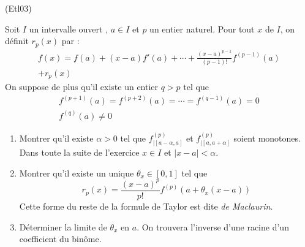 \begin{tiny}(Etl03)\end{tiny}
Soit $I$ un intervalle ouvert , $a\in I$ et $p$ un entier naturel. Pour tout $x$ de $I$, on définit $r_p(x)$ par :
\begin{multline*}
 f(x) = f(a)+(x-a)f'(a)+\cdots+\frac{(x-a)^{p-1}}{(p-1)!}f^{(p-1)}(a)\\+r_p(x)
\end{multline*}
On suppose de plus qu'il existe un entier $q>p$ tel que
\begin{multline*}
 f^{(p+1)}(a)=f^{(p+2)}(a)=\cdots=f^{(q-1)}(a)=0 \\ f^{(q)}(a)\neq 0
\end{multline*}
\begin{enumerate}
 \item Montrer qu'il existe $\alpha >0$ tel que $f^{(p)}_{|[a-\alpha, a]}$ et $f^{(p)}_{|[a, a +\alpha]}$ soient monotones. Dans toute la suite de l'exercice $x\in I$ et $|x-a|<\alpha$.
\item Montrer qu'il existe un unique $\theta_x\in[0,1]$ tel que
\begin{displaymath}
 r_p(x) = \frac{(x-a)^p}{p!}f^{(p)}(a+\theta_x(x-a))
\end{displaymath}
Cette forme du reste de la formule de Taylor est dite \emph{de Maclaurin}.
\item Déterminer la limite de $\theta_x$ en $a$.\newline
On trouvera l'inverse d'une racine d'un coefficient du binôme. 
\end{enumerate}
